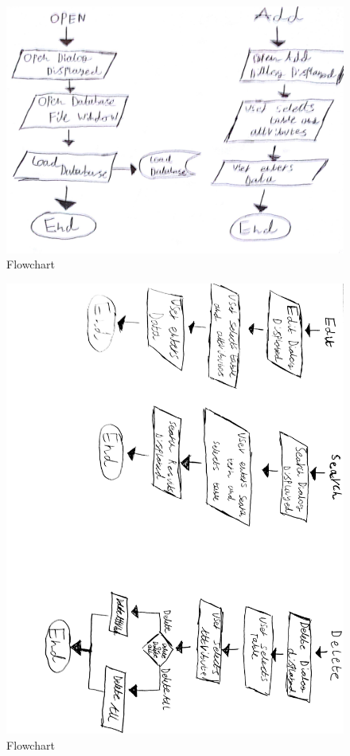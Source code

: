 \begin{figure}[H]
    \includegraphics[width=\textwidth]{flowchart3.jpg}
    \caption{Flowchart} \label{fig:Flowchart}
\end{figure}

\begin{figure}[H]
    \includegraphics[width=\textwidth]{flowchart 2.jpg}
    \caption{Flowchart} \label{fig:Flowchart}
\end{figure}

